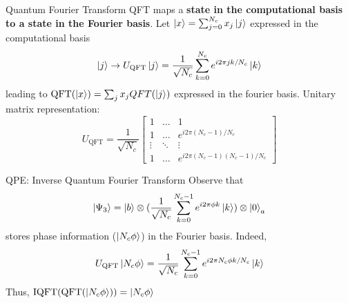 \begin{frame}{Quantum Fourier Transform}
    QFT maps a \textbf{state in the computational basis to a state in the Fourier basis}. Let $\ket{x} = \sum_{j=0}^{N_c} x_j \ket{j}$ expressed in the computational basis
    \begin{equation*}
        \ket{j} \to U_{\text{QFT}}\ket{j} = \frac{1}{\sqrt{N_c}}\sum_{k=0}^{N_c} e^{i2\pi jk /N_c} \ket{k}
    \end{equation*}
    leading to $\text{QFT}(\ket{x})= \sum_j x_j QFT(\ket{j})$  expressed in the fourier basis. Unitary matrix representation:
    \begin{equation*}
        U_{\text{QFT}} = \frac{1}{\sqrt{N_c}} 
        \begin{bmatrix}
            1 & \ldots & 1 \\
            1 & \ldots & e^{i2\pi (N_c-1)/ N_c} \\
            \vdots & \ddots & \vdots \\
            1 & \ldots & e^{i2\pi (N_c-1)(N_c-1)/ N_c}
        \end{bmatrix}
    \end{equation*}
\end{frame}

\begin{frame}{QPE: Inverse Quantum Fourier Transform}
    Observe that
    \begin{equation*}
        \ket{\Psi_3} = \ket{b} \otimes (\frac{1}{\sqrt{N_c}}\sum_{k=0}^{N_c-1} e^{i2\pi \phi k } \ket{k}) \otimes \ket{0}_a 
    \end{equation*}
    stores phase information ($\ket{N_c\phi}$) in the Fourier basis. Indeed,
    \begin{equation*}
        U_{\text{QFT}}\ket{N_c\phi} = \frac{1}{\sqrt{N_c}}\sum_{k=0}^{N_c-1} e^{i2\pi N_c\phi k / N_c} \ket{k}
    \end{equation*}
    Thus, $\text{IQFT}(\text{QFT}(\ket{N_c\phi})) = \ket{N_c\phi}$
    
\end{frame}

